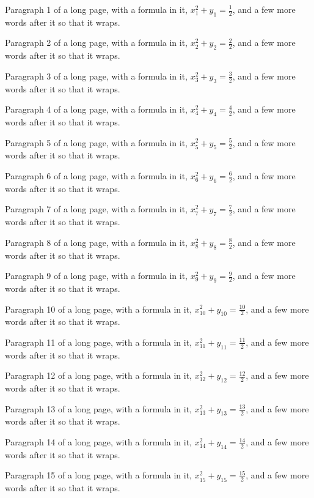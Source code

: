 Paragraph 1 of a long page, with a formula in it, $x_{1}^2 + y_{1} = \frac{1}{2}$, and a few more words after it so that it wraps.

Paragraph 2 of a long page, with a formula in it, $x_{2}^2 + y_{2} = \frac{2}{2}$, and a few more words after it so that it wraps.

Paragraph 3 of a long page, with a formula in it, $x_{3}^2 + y_{3} = \frac{3}{2}$, and a few more words after it so that it wraps.

Paragraph 4 of a long page, with a formula in it, $x_{4}^2 + y_{4} = \frac{4}{2}$, and a few more words after it so that it wraps.

Paragraph 5 of a long page, with a formula in it, $x_{5}^2 + y_{5} = \frac{5}{2}$, and a few more words after it so that it wraps.

Paragraph 6 of a long page, with a formula in it, $x_{6}^2 + y_{6} = \frac{6}{2}$, and a few more words after it so that it wraps.

Paragraph 7 of a long page, with a formula in it, $x_{7}^2 + y_{7} = \frac{7}{2}$, and a few more words after it so that it wraps.

Paragraph 8 of a long page, with a formula in it, $x_{8}^2 + y_{8} = \frac{8}{2}$, and a few more words after it so that it wraps.

Paragraph 9 of a long page, with a formula in it, $x_{9}^2 + y_{9} = \frac{9}{2}$, and a few more words after it so that it wraps.

Paragraph 10 of a long page, with a formula in it, $x_{10}^2 + y_{10} = \frac{10}{2}$, and a few more words after it so that it wraps.

Paragraph 11 of a long page, with a formula in it, $x_{11}^2 + y_{11} = \frac{11}{2}$, and a few more words after it so that it wraps.

Paragraph 12 of a long page, with a formula in it, $x_{12}^2 + y_{12} = \frac{12}{2}$, and a few more words after it so that it wraps.

Paragraph 13 of a long page, with a formula in it, $x_{13}^2 + y_{13} = \frac{13}{2}$, and a few more words after it so that it wraps.

Paragraph 14 of a long page, with a formula in it, $x_{14}^2 + y_{14} = \frac{14}{2}$, and a few more words after it so that it wraps.

Paragraph 15 of a long page, with a formula in it, $x_{15}^2 + y_{15} = \frac{15}{2}$, and a few more words after it so that it wraps.

